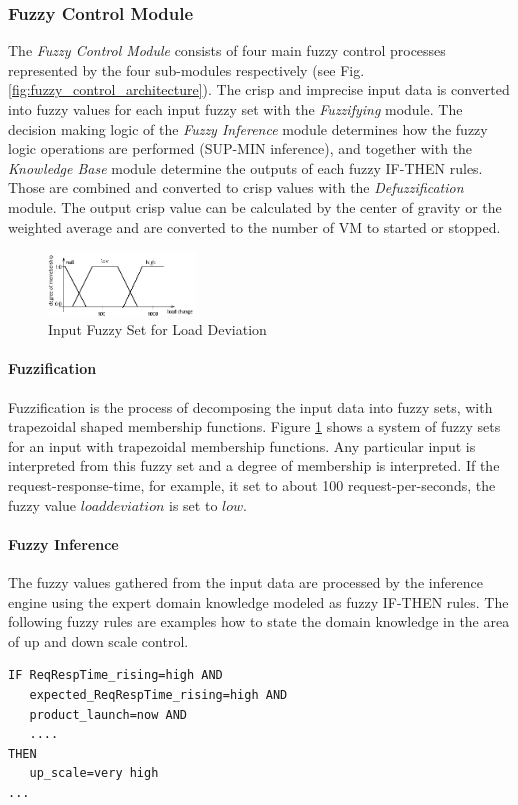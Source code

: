 \subsubsection{Fuzzy Control Module}\label{fuzzyControlModule}
The \textit{Fuzzy Control Module} consists of four main fuzzy control processes represented by the four sub-modules respectively (see Fig. \ref{fig:fuzzy_control_architecture}). The crisp and imprecise input data is converted into fuzzy values for each input fuzzy set with the \textit{Fuzzifying} module.
The decision making logic of the \textit{Fuzzy Inference} module determines how the fuzzy logic operations are performed (SUP-MIN inference), and together with the \textit{Knowledge Base} module determine the outputs of each fuzzy IF-THEN rules. Those are combined and converted to crisp values with the \textit{Defuzzification} module. The output crisp value can be calculated by the center of gravity or the weighted average and are converted to the number of VM to started or stopped.

\begin{figure}[ht]
\begin{center}
\includegraphics[width=0.35\textwidth]{fig/fuzzy_load_usage.png}
\end{center}
\caption{Input Fuzzy Set for Load Deviation}
\label{fig:fuzzy_inputset}
\end{figure}

\paragraph*{Fuzzification}
Fuzzification is the process of decomposing the input data into fuzzy sets, with trapezoidal shaped membership functions. Figure \ref{fig:fuzzy_inputset} shows a system of fuzzy sets for an input with trapezoidal membership functions. Any particular input is interpreted from this fuzzy set and a degree of membership is interpreted. If the request-response-time, for example, it set to about 100 request-per-seconds, the fuzzy value $load deviation$ is set to $low$.

\paragraph*{Fuzzy Inference}
The fuzzy values gathered from the input data are processed by the inference engine using the expert domain knowledge modeled as fuzzy IF-THEN rules. The following fuzzy rules are examples how to state the domain knowledge in the area of up and down scale control.
\begin{center}
\begin{verbatim}
IF ReqRespTime_rising=high AND
   expected_ReqRespTime_rising=high AND
   product_launch=now AND
   ....
THEN
   up_scale=very high
...
\end{verbatim}
\end{center}

